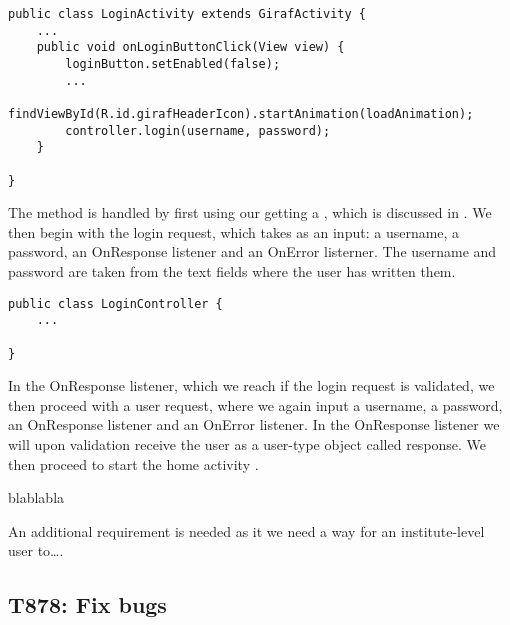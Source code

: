 \begin{minipage}[H]{\linewidth}
\begin{lstlisting}[caption = ??? , label = onLoginButtonClick] 
public class LoginActivity extends GirafActivity {
	...
	public void onLoginButtonClick(View view) {
        loginButton.setEnabled(false);
 		...
        findViewById(R.id.girafHeaderIcon).startAnimation(loadAnimation);
        controller.login(username, password);
    }

}
\end{lstlisting}
\end{minipage}


The  method is handled by first using our getting a , which is discussed in . We then begin with the login
request, which takes as an input: a username, a password, an OnResponse
listener and an OnError listerner. The username and password are taken from the
text fields where the user has written them.

\begin{minipage}[H]{\linewidth}
\begin{lstlisting}[caption = ??? , label = loginController] 
public class LoginController {
	...
	
}
\end{lstlisting}
\end{minipage}

In the OnResponse listener, which we reach if the login request is validated, we
then proceed with a user request, where we again input a username, a password,
an OnResponse listener and an OnError listener. In the OnResponse listener we
will upon validation receive the user as a user-type object called response. We
then proceed to start the home activity .

blablabla

An additional requirement is needed as it we need a way for an institute-level
user to\ldots. 






\subsection{T878: Fix bugs}


